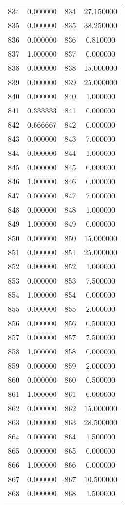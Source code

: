 \documentclass[12pt]{article}
\begin{document}
\begin{longtable}{@{}cccc@{}}
834 & 0.000000 & 834 & 27.150000 \\
835 & 0.000000 & 835 & 38.250000 \\
836 & 0.000000 & 836 & 0.810000 \\
837 & 1.000000 & 837 & 0.000000 \\
838 & 0.000000 & 838 & 15.000000 \\
839 & 0.000000 & 839 & 25.000000 \\
840 & 0.000000 & 840 & 1.000000 \\
841 & 0.333333 & 841 & 0.000000 \\
842 & 0.666667 & 842 & 0.000000 \\
843 & 0.000000 & 843 & 7.000000 \\
844 & 0.000000 & 844 & 1.000000 \\
845 & 0.000000 & 845 & 0.000000 \\
846 & 1.000000 & 846 & 0.000000 \\
847 & 0.000000 & 847 & 7.000000 \\
848 & 0.000000 & 848 & 1.000000 \\
849 & 1.000000 & 849 & 0.000000 \\
850 & 0.000000 & 850 & 15.000000 \\
851 & 0.000000 & 851 & 25.000000 \\
852 & 0.000000 & 852 & 1.000000 \\
853 & 0.000000 & 853 & 7.500000 \\
854 & 1.000000 & 854 & 0.000000 \\
855 & 0.000000 & 855 & 2.000000 \\
856 & 0.000000 & 856 & 0.500000 \\
857 & 0.000000 & 857 & 7.500000 \\
858 & 1.000000 & 858 & 0.000000 \\
859 & 0.000000 & 859 & 2.000000 \\
860 & 0.000000 & 860 & 0.500000 \\
861 & 1.000000 & 861 & 0.000000 \\
862 & 0.000000 & 862 & 15.000000 \\
863 & 0.000000 & 863 & 28.500000 \\
864 & 0.000000 & 864 & 1.500000 \\
865 & 0.000000 & 865 & 0.000000 \\
866 & 1.000000 & 866 & 0.000000 \\
867 & 0.000000 & 867 & 10.500000 \\
868 & 0.000000 & 868 & 1.500000 \\

\end{longtable}
\end{document}
